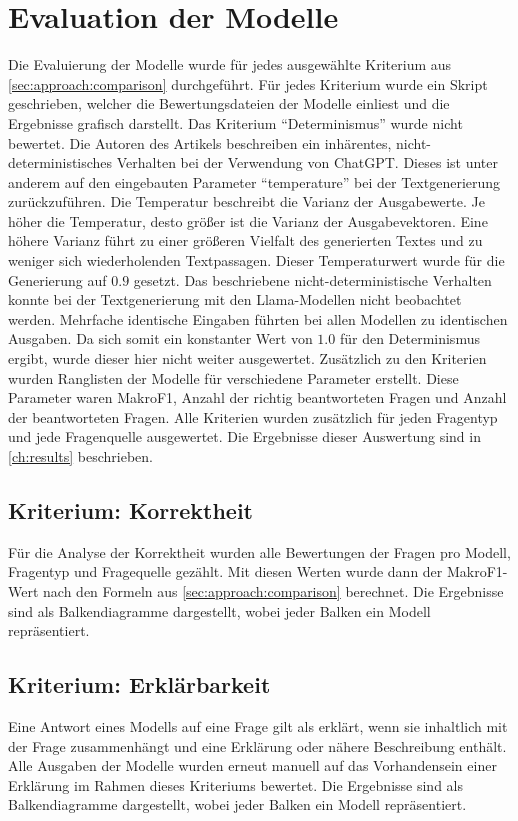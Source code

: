 \section{Evaluation der Modelle}\label{sec:evaluation}
Die Evaluierung der Modelle wurde für jedes ausgewählte Kriterium aus \cref{sec:approach:comparison} durchgeführt.
Für jedes Kriterium wurde ein Skript geschrieben, welcher die Bewertungsdateien der Modelle einliest und die Ergebnisse grafisch darstellt.
Das Kriterium \enquote{Determinismus} wurde nicht bewertet.
Die Autoren des Artikels \citet{chatgpt_qas} beschreiben ein inhärentes, nicht-deterministisches Verhalten bei der Verwendung von ChatGPT.
Dieses ist unter anderem auf den eingebauten Parameter \enquote{temperature} bei der Textgenerierung zurückzuführen.
Die Temperatur beschreibt die Varianz der Ausgabewerte.
Je höher die Temperatur, desto größer ist die Varianz der Ausgabevektoren.
Eine höhere Varianz führt zu einer größeren Vielfalt des generierten Textes und zu weniger sich wiederholenden Textpassagen.
Dieser Temperaturwert wurde für die Generierung auf $0.9$ gesetzt.
Das beschriebene nicht-deterministische Verhalten konnte bei der Textgenerierung mit den Llama-Modellen nicht beobachtet werden.
Mehrfache identische Eingaben führten bei allen Modellen zu identischen Ausgaben.
Da sich somit ein konstanter Wert von $1.0$ für den Determinismus ergibt, wurde dieser hier nicht weiter ausgewertet.
Zusätzlich zu den Kriterien wurden Ranglisten der Modelle für verschiedene Parameter erstellt.
Diese Parameter waren MakroF1, Anzahl der richtig beantworteten Fragen und Anzahl der beantworteten Fragen.
Alle Kriterien wurden zusätzlich für jeden Fragentyp und jede Fragenquelle ausgewertet.
Die Ergebnisse dieser Auswertung sind in \cref{ch:results} beschrieben.\\

\subsection{Kriterium: Korrektheit}
Für die Analyse der Korrektheit wurden alle Bewertungen der Fragen pro Modell, Fragentyp und Fragequelle gezählt.
Mit diesen Werten wurde dann der MakroF1-Wert nach den Formeln aus \cref{sec:approach:comparison} berechnet.
Die Ergebnisse sind als Balkendiagramme dargestellt, wobei jeder Balken ein Modell repräsentiert.\\

\subsection{Kriterium: Erklärbarkeit}
Eine Antwort eines Modells auf eine Frage gilt als erklärt, wenn sie inhaltlich mit der Frage zusammenhängt und eine Erklärung oder nähere Beschreibung enthält.
Alle Ausgaben der Modelle wurden erneut manuell auf das Vorhandensein einer Erklärung im Rahmen dieses Kriteriums bewertet.
Die Ergebnisse sind als Balkendiagramme dargestellt, wobei jeder Balken ein Modell repräsentiert.\\

